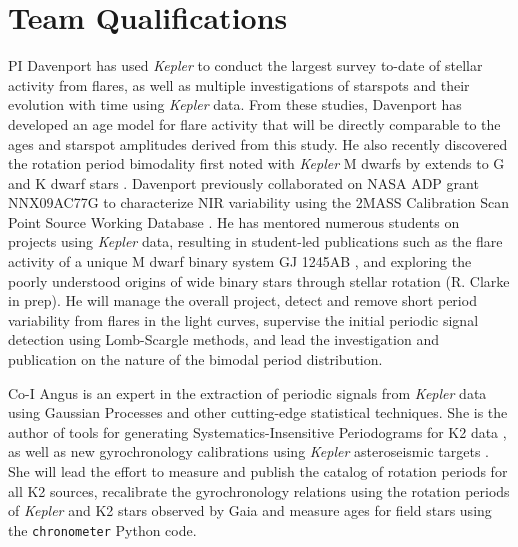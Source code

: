 \documentclass[12pt]{article}
\newcommand{\Kepler}{\textsl{Kepler}\xspace}
\begin{document}



\section{Team Qualifications}
PI Davenport has used \Kepler to conduct the largest survey to-date of stellar activity from flares, as well as multiple investigations of starspots and their evolution with time using \Kepler data. From these studies, Davenport has developed an age model for flare activity that will be directly comparable to the ages and starspot amplitudes derived from this study. He also recently discovered the rotation period bimodality first noted with \Kepler M dwarfs by \citet{mcquillan2013} extends to G and K dwarf stars \citep{davenport2017}.
Davenport previously collaborated on NASA ADP grant NNX09AC77G to characterize NIR variability using the 2MASS Calibration Scan Point Source Working Database \citep{davenport2012,davenport2015a}.
He has mentored numerous students on projects using \Kepler data, resulting in student-led publications such as the flare activity of a unique M dwarf binary system GJ 1245AB \citep{lurie2015}, and exploring the poorly understood origins of wide binary stars through stellar rotation (R. Clarke in prep). He will manage the overall project, detect and remove short period variability from flares in the light curves, supervise the initial periodic signal detection using Lomb-Scargle methods, and lead the investigation and publication on the nature of the bimodal period distribution.

Co-I Angus is an expert in the extraction of periodic signals from \Kepler
data using Gaussian Processes \citep{angus2016c} and other cutting-edge
statistical techniques.
She is the author of tools for generating Systematics-Insensitive Periodograms
for K2 data \citep{angus2016}, as well as new gyrochronology calibrations
using \Kepler asteroseismic targets \citep{angus2015}.
She will lead the effort to measure and publish the catalog of rotation
periods for all K2 sources, recalibrate the gyrochronology relations using the
rotation periods of \Kepler and K2 stars observed by Gaia and measure ages for
field stars using the {\tt chronometer} Python code.
\end{document}
